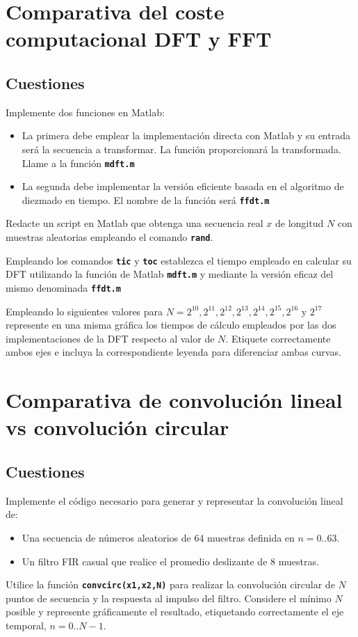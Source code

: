\documentclass{article}
\newcommand{\code}[1]{\texttt{\textbf{#1}}}
\begin{document}
\section{Comparativa del coste computacional DFT y FFT}
\subsection*{Cuestiones}
Implemente dos funciones en Matlab:
\begin{itemize}
\item La primera debe emplear la implementación directa con Matlab y su entrada será la secuencia a transformar. La función proporcionará la transformada. Llame a la función \code{mdft.m}
\item La segunda debe implementar la versión eficiente basada en el algoritmo de diezmado en tiempo. El nombre de la función será \code{ffdt.m}
\end{itemize}
Redacte un script en Matlab que obtenga una secuencia real $x$ de longitud $N$ con muestras aleatorias empleando el comando \code{rand}.

Empleando los comandos \code{tic} y \code{toc} establezca el tiempo empleado en calcular su DFT utilizando la función de Matlab \code{mdft.m} y mediante la versión eficaz del mismo denominada \code{ffdt.m}

Empleando lo siguientes valores para $N=2^{10},2^{11},2^{12},2^{13},2^{14},2^{15},2^{16}$ y $2^{17}$ represente en una misma gráfica los tiempos de cálculo empleados por las dos implementaciones de la DFT respecto al valor de $N$. Etiquete correctamente ambos ejes e incluya la correspondiente leyenda para diferenciar ambas curvas.
\section{Comparativa de convolución lineal vs convolución circular}
\subsection*{Cuestiones}
Implemente el código necesario para generar y representar la convolución lineal de:
\begin{itemize}
\item Una secuencia de números aleatorios de 64 muestras definida en $n=0..63$.
\item Un filtro FIR casual que realice el promedio deslizante de 8 muestras.
\end{itemize}
Utilice la función \code{convcirc(x1,x2,N)} para realizar la convolución circular de $N$ puntos de secuencia y la respuesta al impulso del filtro. Considere el mínimo $N$ posible y represente gráficamente el resultado, etiquetando correctamente el eje temporal, $n=0..N-1$.
\end{document}
